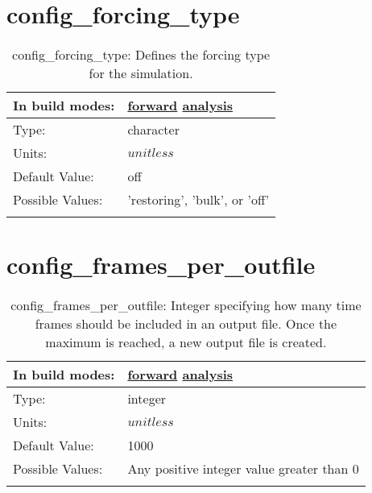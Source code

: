 \section[config\_forcing\_type]{config\_forcing\_type}
\label{sec:nm_sec_config_forcing_type}
\begin{center}
\begin{longtable}{| p{2.0in} || p{4.0in} |}
    \hline
    In build modes: & \hyperref[subsec:forward_nm_tab_forcing]{forward} \hyperref[subsec:analysis_nm_tab_forcing]{analysis} \\
    \hline
    Type: & character \\
    \hline
    Units: & $unitless$ \\
    \hline
    Default Value: & off \\
    \hline
    Possible Values: & 'restoring', 'bulk', or 'off' \\
    \hline
    \caption{config\_forcing\_type: Defines the forcing type for the simulation.}
\end{longtable}
\end{center}
\section[config\_frames\_per\_outfile]{config\_frames\_per\_outfile}
\label{sec:nm_sec_config_frames_per_outfile}
\begin{center}
\begin{longtable}{| p{2.0in} || p{4.0in} |}
    \hline
    In build modes: & \hyperref[subsec:forward_nm_tab_io]{forward} \hyperref[subsec:analysis_nm_tab_io]{analysis} \\
    \hline
    Type: & integer \\
    \hline
    Units: & $unitless$ \\
    \hline
    Default Value: & 1000 \\
    \hline
    Possible Values: & Any positive integer value greater than 0 \\
    \hline
    \caption{config\_frames\_per\_outfile: Integer specifying how many time frames should be included in an output file. Once the maximum is reached, a new output file is created.}
\end{longtable}
\end{center}
